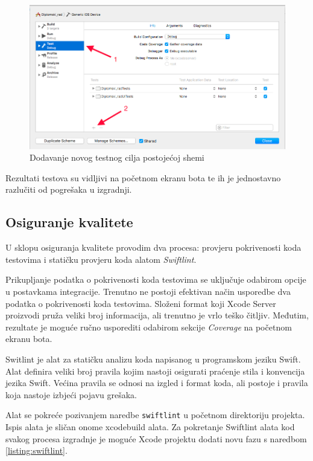 \documentclass[times, utf8, diplomski, numeric]{fer}
\begin{document}
\begin{appendices}
\begin{figure}
\centering
\includegraphics[scale=0.4]{AddingTests}
\caption{Dodavanje novog testnog cilja postojećoj shemi}
\label{fig:AddingTests}
\end{figure}

Rezultati testova su vidljivi na početnom ekranu bota te ih je jednostavno razlučiti od pogrešaka u izgradnji.

\subsection{Osiguranje kvalitete}

U sklopu osiguranja kvalitete provodim dva procesa: provjeru pokrivenosti koda testovima i statičku provjeru koda alatom \textit{Swiftlint}.

Prikupljanje podatka o pokrivenosti koda testovima se uključuje odabirom opcije  u postavkama integracije. Trenutno ne postoji efektivan način usporedbe dva podatka o pokrivenosti koda testovima. Složeni format koji Xcode Server proizvodi pruža veliki broj informacija, ali trenutno je vrlo teško čitljiv. Međutim, rezultate je moguće ručno usporediti odabirom sekcije \textit{Coverage} na početnom ekranu bota.

Switlint je alat za statičku analizu koda napisanog u programskom jeziku Swift. Alat definira veliki broj pravila kojim nastoji osigurati praćenje stila i konvencija jezika Swift. Većina pravila se odnosi na izgled i format koda, ali postoje i pravila koja nastoje izbjeći pojavu grešaka.

Alat se pokreće pozivanjem naredbe \verb|swiftlint| u početnom direktoriju projekta. Ispis alata je sličan onome xcodebuild alata. Za pokretanje Swiftlint alata kod svakog procesa izgradnje je moguće Xcode projektu dodati novu  fazu s naredbom \ref{listing:swiftlint}.


\end{appendices}
\end{document}
